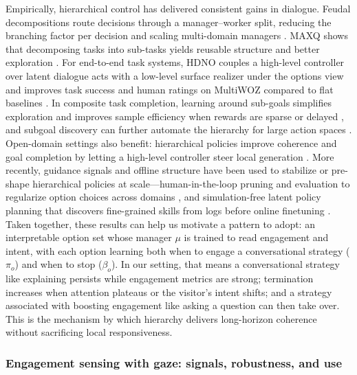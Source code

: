 \documentclass[12pt]{article}
\begin{document}
Empirically, hierarchical control has delivered consistent gains in dialogue. Feudal decompositions route decisions through a manager--worker split, reducing the branching factor per decision and scaling multi-domain managers \citep{dayan1993feudal,casanueva2018feudal}. MAXQ shows that decomposing tasks into sub-tasks yields reusable structure and better exploration \citep{dietterich2000maxq}. For end-to-end task systems, HDNO couples a high-level controller over latent dialogue acts with a low-level surface realizer under the options view and improves task success and human ratings on MultiWOZ compared to flat baselines \citep{wang2021hdno}. In composite task completion, learning around sub-goals simplifies exploration and improves sample efficiency when rewards are sparse or delayed \citep{peng2017composite}, and subgoal discovery can further automate the hierarchy for large action spaces \citep{tang2018subgoal}. Open-domain settings also benefit: hierarchical policies improve coherence and goal completion by letting a high-level controller steer local generation \citep{saleh2020hierarchical}. More recently, guidance signals and offline structure have been used to stabilize or pre-shape hierarchical policies at scale—human-in-the-loop pruning and evaluation to regularize option choices across domains \citep{rohmatillah2023hrl_guidance}, and simulation-free latent policy planning that discovers fine-grained skills from logs before online finetuning \citep{he2025ldpp}.\\

Taken together, these results can help us motivate a pattern to adopt: an interpretable option set whose manager $\mu$ is trained to read engagement and intent, with each option learning both when to engage a conversational strategy ($\pi_o$) and when to stop ($\beta_o$). In our setting, that means a conversational strategy like explaining persists while engagement metrics are strong; termination increases when attention plateaus or the visitor’s intent shifts; and a strategy associated with boosting engagement like asking a question can then take over. This is the mechanism by which hierarchy delivers long-horizon coherence without sacrificing local responsiveness.\\

\subsubsection{Engagement sensing with gaze: signals, robustness, and use}
\end{document}
